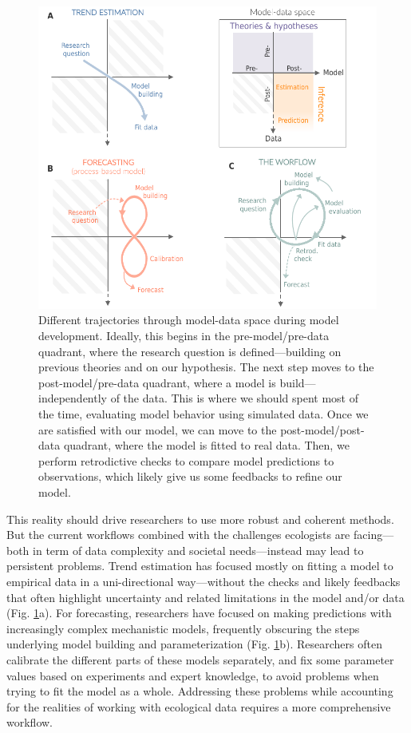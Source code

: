 \documentclass[11pt]{article}
\begin{document}
\begin{figure}[h]
	\centering
	\includegraphics{figures/modeldataspaces_rotation}
	\caption{Different trajectories through model-data space during model development. Ideally, this begins in the pre-model/pre-data quadrant, where the research question is defined---building on previous theories and on our hypothesis. The next step moves to the post-model/pre-data quadrant, where a model is build---independently of the data. This is where we should spent most of the time, evaluating model behavior using simulated data. Once we are satisfied with our model, we can move to the post-model/post-data quadrant, where the model is fitted to real data. Then, we perform retrodictive checks to compare model predictions to observations, which likely give us some feedbacks to refine our model.} 
	\label{fig:modeldata}
\end{figure}

This reality should drive researchers to use more robust and coherent methods. But the current workflows combined with the challenges ecologists are facing---both in term of data complexity and societal needs---instead may lead to persistent problems. %
Trend estimation has focused mostly on fitting a model to empirical data in a uni-directional way---without the checks and likely feedbacks that often highlight uncertainty and related limitations in the model and/or data (Fig. \ref{fig:modeldata}a). For forecasting, researchers have focused on making predictions with increasingly complex mechanistic models, frequently obscuring the steps underlying model building and parameterization (Fig. \ref{fig:modeldata}b). Researchers often calibrate the different parts of these models separately, and fix some parameter values based on experiments and expert knowledge, to avoid problems when trying to fit the model as a whole. %
Addressing these problems while accounting for the realities of working with ecological data requires a more comprehensive workflow.
\end{document}
